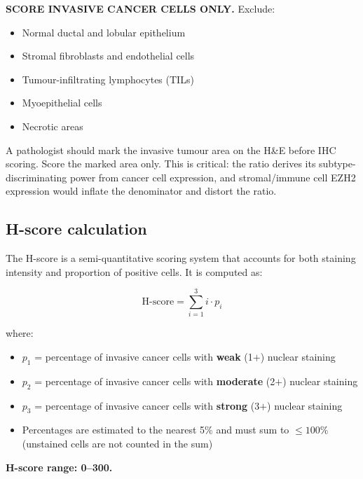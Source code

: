 \documentclass[11pt, a4paper]{article}
\begin{document}
\begin{mdframed}[backgroundcolor=scorebox,
                 linecolor=purple!50!black,
                 linewidth=1pt]
\textbf{SCORE INVASIVE CANCER CELLS ONLY.}
Exclude:
\begin{itemize}[noitemsep]
    \item Normal ductal and lobular epithelium
    \item Stromal fibroblasts and endothelial cells
    \item Tumour-infiltrating lymphocytes (TILs)
    \item Myoepithelial cells
    \item Necrotic areas
\end{itemize}
A pathologist should mark the invasive tumour area
on the H\&E before IHC scoring. Score the marked
area only. This is critical: the ratio derives its
subtype-discriminating power from cancer cell
expression, and stromal/immune cell EZH2 expression
would inflate the denominator and distort the ratio.
\end{mdframed}

\subsection{H-score calculation}

The H-score is a semi-quantitative scoring system
that accounts for both staining intensity and
proportion of positive cells. It is computed as:

\begin{equation}
\text{H-score} = \sum_{i=1}^{3} i \cdot p_i
\end{equation}

where:
\begin{itemize}
    \item $p_1$ = percentage of invasive cancer
    cells with \textbf{weak} (1$+$) nuclear staining
    \item $p_2$ = percentage of invasive cancer
    cells with \textbf{moderate} (2$+$) nuclear
    staining
    \item $p_3$ = percentage of invasive cancer
    cells with \textbf{strong} (3$+$) nuclear
    staining
    \item Percentages are estimated to the nearest
    5\% and must sum to $\leq 100\%$ (unstained
    cells are not counted in the sum)
\end{itemize}

\textbf{H-score range: 0--300.}
\end{document}
